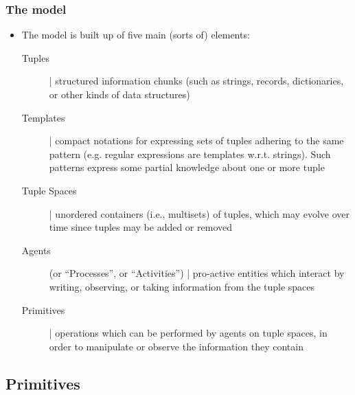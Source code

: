 \documentclass[presentation]{beamer}\mode<presentation>{\usetheme{AMSCesenaPurpleAndGold}}
\begin{document}
\begin{frame}%
\frametitle{The \linda{} model}

\begin{itemize}
	\item<1-> The \linda{} model is built up of five main (sorts of) elements:
	\begin{description}
		\item[Tuples] | structured information chunks (such as strings, records, dictionaries, or other kinds of \alert{data structures})
		
		\item[Templates] | compact notations for expressing sets of tuples adhering to the same pattern (e.g. regular expressions are templates w.r.t. strings).
		Such patterns express some \alert{partial knowledge} about one or more tuple
		
		\item[Tuple Spaces] | unordered containers (i.e., \alert{multisets}) of tuples, which may evolve over time since tuples may be added or removed
		
		\item[Agents] (or ``Processes'', or ``Activities'') | pro-active entities which interact by writing, observing, or taking information from the tuple spaces
		
		\item[Primitives] | operations which can be performed by agents on tuple spaces, in order to manipulate or observe the information they contain
		
	\end{description}
	
\end{itemize}

\end{frame}

\subsection{Primitives} 
\end{document}
